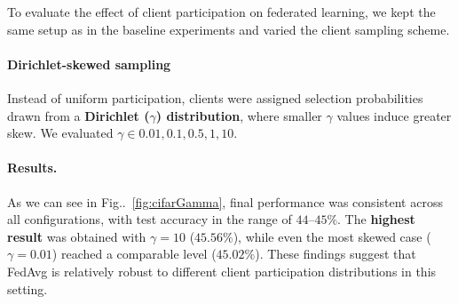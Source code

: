 \documentclass[10pt,twocolumn,letterpaper]{article}
\begin{document}
To evaluate the effect of client participation on federated learning, we kept the same setup as in the baseline experiments  and varied the client sampling scheme.

\paragraph{Dirichlet-skewed sampling}
Instead of uniform participation, clients were assigned selection probabilities drawn from a \textbf{Dirichlet (\boldmath$\gamma$) distribution}, where smaller $\gamma$ values induce greater skew. We evaluated \textbf{\boldmath$\gamma \in {0.01, 0.1, 0.5, 1, 10}$}.

\paragraph{Results.} As we can see in Fig..~\ref{fig:cifarGamma}, final performance was consistent across all configurations, with test accuracy in the range of $44$--$45\%$. The \textbf{highest result} was obtained with \textbf{\boldmath$\gamma=10$} ($45.56\%$), while even the most skewed case ($\gamma=0.01$) reached a comparable level ($45.02\%$). These findings suggest that FedAvg is relatively robust to different client participation distributions in this setting.
\end{document}
